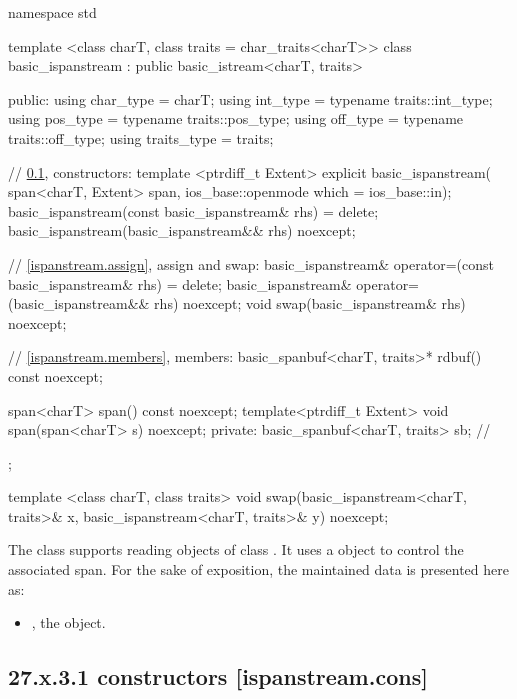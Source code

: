 \documentclass[ebook,11pt,article]{memoir}
\begin{document}
\begin{codeblock}
namespace std {
  template <class charT, class traits = char_traits<charT>>
  class basic_ispanstream
    : public basic_istream<charT, traits> {
  public:
    using char_type      = charT;
    using int_type       = typename traits::int_type;
    using pos_type       = typename traits::pos_type;
    using off_type       = typename traits::off_type;
    using traits_type    = traits;

    // \ref{ispanstream.cons}, constructors:
    template <ptrdiff_t Extent>
    explicit basic_ispanstream(
      span<charT, Extent> span,
      ios_base::openmode which = ios_base::in);
    basic_ispanstream(const basic_ispanstream& rhs) = delete;
    basic_ispanstream(basic_ispanstream&& rhs) noexcept;

    // \ref{ispanstream.assign}, assign and swap:
    basic_ispanstream& operator=(const basic_ispanstream& rhs) = delete;
    basic_ispanstream& operator=(basic_ispanstream&& rhs) noexcept;
    void swap(basic_ispanstream& rhs) noexcept;

    // \ref{ispanstream.members}, members:
    basic_spanbuf<charT, traits>* rdbuf() const noexcept;

    span<charT> span() const noexcept;
	template<ptrdiff_t Extent>
    void span(span<charT> s) noexcept;
  private:
    basic_spanbuf<charT, traits> sb; // \expos
  };

  template <class charT, class traits>
    void swap(basic_ispanstream<charT, traits>& x,
              basic_ispanstream<charT, traits>& y) noexcept;
}
\end{codeblock}

\pnum
The class
supports reading objects of class
.
It uses a
object to control the associated span.
For the sake of exposition, the maintained data is presented here as:
\begin{itemize}
\item
{}, the  object.
\end{itemize}

\subsection{27.x.3.1  constructors [ispanstream.cons]}
\label{ispanstream.cons}
\end{document}
